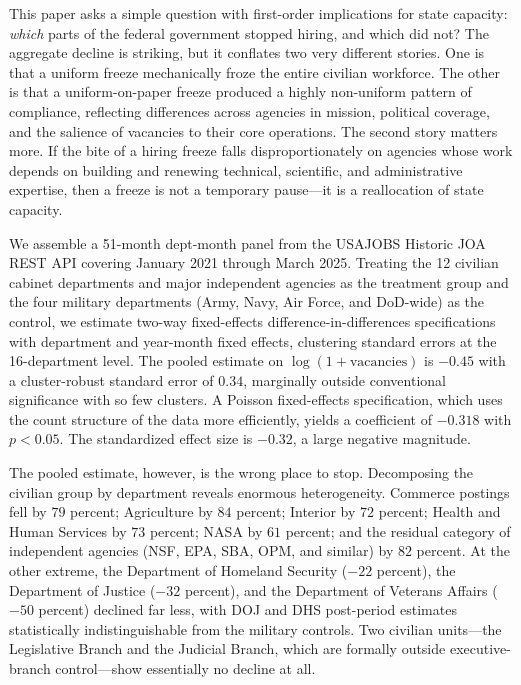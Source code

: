 \documentclass[12pt]{article}
\begin{document}
This paper asks a simple question with first-order implications for state capacity: \emph{which} parts of the federal government stopped hiring, and which did not? The aggregate decline is striking, but it conflates two very different stories. One is that a uniform freeze mechanically froze the entire civilian workforce. The other is that a uniform-on-paper freeze produced a highly non-uniform pattern of compliance, reflecting differences across agencies in mission, political coverage, and the salience of vacancies to their core operations. The second story matters more. If the bite of a hiring freeze falls disproportionately on agencies whose work depends on building and renewing technical, scientific, and administrative expertise, then a freeze is not a temporary pause---it is a reallocation of state capacity.

We assemble a 51-month dept-month panel from the USAJOBS Historic JOA REST API covering January 2021 through March 2025. Treating the 12 civilian cabinet departments and major independent agencies as the treatment group and the four military departments (Army, Navy, Air Force, and DoD-wide) as the control, we estimate two-way fixed-effects difference-in-differences specifications with department and year-month fixed effects, clustering standard errors at the 16-department level. The pooled estimate on $\log(1+\text{vacancies})$ is $-0.45$ with a cluster-robust standard error of $0.34$, marginally outside conventional significance with so few clusters. A Poisson fixed-effects specification, which uses the count structure of the data more efficiently, yields a coefficient of $-0.318$ with $p<0.05$. The standardized effect size is $-0.32$, a large negative magnitude.

The pooled estimate, however, is the wrong place to stop. Decomposing the civilian group by department reveals enormous heterogeneity. Commerce postings fell by $79$ percent; Agriculture by $84$ percent; Interior by $72$ percent; Health and Human Services by $73$ percent; NASA by $61$ percent; and the residual category of independent agencies (NSF, EPA, SBA, OPM, and similar) by $82$ percent. At the other extreme, the Department of Homeland Security ($-22$ percent), the Department of Justice ($-32$ percent), and the Department of Veterans Affairs ($-50$ percent) declined far less, with DOJ and DHS post-period estimates statistically indistinguishable from the military controls. Two civilian units---the Legislative Branch and the Judicial Branch, which are formally outside executive-branch control---show essentially no decline at all.
\end{document}
